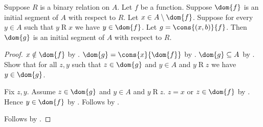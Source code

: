 \begin{proposition}\label{recursive_initial_segment_extension}
    Suppose $R$ is a binary relation on $A$.
    Let $f$ be a function.
    Suppose $\dom{f}$ is an initial segment of $A$ with respect to $R$.
    Let $x\in A\setminus\dom{f}$.
    Suppose for every $y\in A$ such that $y\mathrel{R}x$ we have
        $y\in\dom{f}$.
    Let $g=\cons{(x,b)}{f}$.
    Then $\dom{g}$ is an initial segment of $A$ with respect to $R$.
\end{proposition}
\begin{proof}
    $x\notin\dom{f}$ by .
    $\dom{g}=\cons{x}{\dom{f}}$ by
        .
    $\dom{g}\subseteq A$ by
        .
    Show that for all $z,y$ such that $z\in\dom{g}$ and $y\in A$
        and $y\mathrel{R}z$ we have $y\in\dom{g}$.
    \begin{subproof}
        Fix $z,y$.
        Assume $z\in\dom{g}$ and $y\in A$ and $y\mathrel{R}z$.
        $z=x$ or $z\in\dom{f}$ by .
        Hence $y\in\dom{f}$ by .
        Follows by .
    \end{subproof}
    Follows by .
\end{proof}

